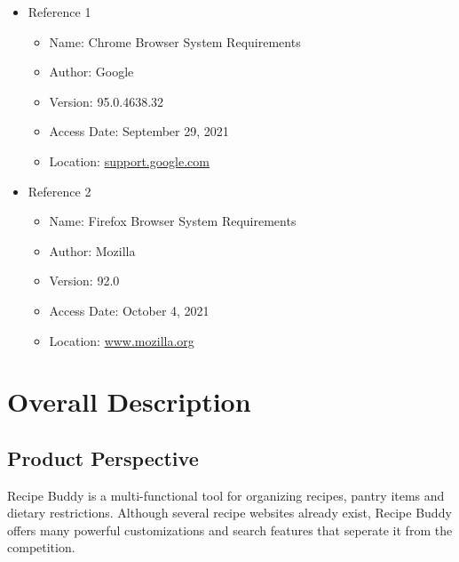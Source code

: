 \documentclass{scrreprt}
\begin{document}
\begin{itemize}
    \item Reference 1
          \begin{itemize}
              \item Name: Chrome Browser System Requirements
              \item Author: Google
              \item Version: 95.0.4638.32
              \item Access Date: September 29, 2021
              \item Location: \href{https://support.google.com/chrome/a/answer/7100626?hl=en}{support.google.com}
          \end{itemize}
    \item Reference 2
          \begin{itemize}
              \item Name: Firefox Browser System Requirements
              \item Author: Mozilla
              \item Version: 92.0
              \item Access Date: October 4, 2021
              \item Location: \href{https://www.mozilla.org/en-US/firefox/92.0.1/system-requirements/}{www.mozilla.org}
          \end{itemize}
\end{itemize}

\chapter{Overall Description}

\section{Product Perspective}
\gls{Recipe Buddy} is a multi-functional tool for organizing recipes, pantry items and dietary restrictions.
Although several recipe websites already exist, \gls{Recipe Buddy} offers many powerful customizations and search features that seperate it from the competition.
\end{document}
